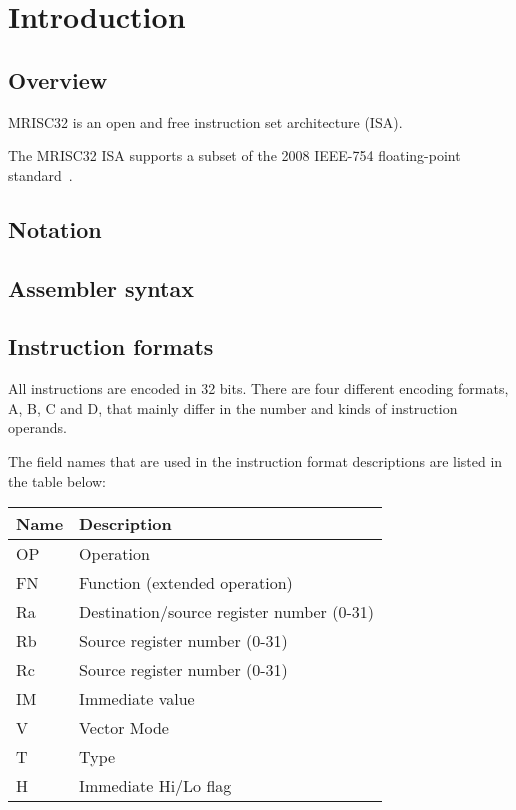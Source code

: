 %

\chapter{Introduction}

\section{Overview}

MRISC32 is an open and free instruction set architecture (ISA).

The MRISC32 ISA supports a subset of the 2008 IEEE-754 floating-point
standard~\cite{ieee754-2008}.

\section{Notation}

\tbd

\section{Assembler syntax}

\tbd

\section{Instruction formats}

All instructions are encoded in 32 bits. There are four different encoding
formats, A, B, C and D, that mainly differ in the number and kinds of
instruction operands.

The field names that are used in the instruction format descriptions are listed
in the table below:

\begin{tabular}{|l|l|}
  \hline
  \textbf{Name} & \textbf{Description} \\
  \hline
  OP & Operation \\
  \hline
  FN & Function (extended operation) \\
  \hline
  Ra & Destination/source register number (0-31) \\
  \hline
  Rb & Source register number (0-31) \\
  \hline
  Rc & Source register number (0-31) \\
  \hline
  IM & Immediate value \\
  \hline
  V  & Vector Mode \\
  \hline
  T  & Type \\
  \hline
  H  & Immediate Hi/Lo flag \\
  \hline
\end{tabular}

